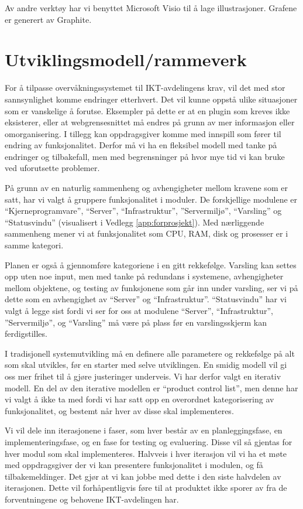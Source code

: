 Av andre verktøy har vi benyttet Microsoft Visio til å lage illustrasjoner. Grafene er generert av Graphite.

\section{Utviklingsmodell/rammeverk}
For å tilpasse overvåkningssystemet til IKT-avdelingens krav, vil det med stor sannsynlighet komme endringer etterhvert. Det vil kunne oppstå ulike situasjoner som er vanskelige å forutse. Eksempler på dette er at en plugin som kreves ikke eksisterer, eller at webgrensesnittet må endres på grunn av mer informasjon eller omorganisering. I tillegg kan oppdragsgiver komme med innspill som fører til endring av funksjonalitet. Derfor må vi ha en fleksibel modell med tanke på endringer og tilbakefall, men med begrensninger på hvor mye tid vi kan bruke ved uforutsette problemer.

På grunn av en naturlig sammenheng og avhengigheter mellom kravene som er satt, har vi valgt å gruppere funksjonalitet i moduler. De forskjellige modulene er ``Kjerneprogramvare'', ``Server'', ``Infrastruktur'', ''Servermiljø'', ``Varsling'' og ``Statusvindu'' (visualisert i Vedlegg \ref{app:forprosjekt}). Med nærliggende sammenheng mener vi at funksjonalitet som CPU, RAM, disk og prosesser er i samme kategori. 

Planen er også å gjennomføre kategoriene i en gitt rekkefølge. Varsling kan settes opp uten noe input, men med tanke på redundans i systemene, avhengigheter mellom objektene, og testing av funksjonene som går inn under varsling, ser vi på dette som en avhengighet av ``Server'' og ``Infrastruktur''. ``Statusvindu'' har vi valgt å legge sist fordi vi ser for oss at modulene ``Server'', ``Infrastruktur'', ''Servermiljø'', og ``Varsling'' må være på plass før en varslingsskjerm kan ferdigstilles.

I tradisjonell systemutvikling må en definere alle parametere og rekkefølge på alt som skal utvikles, før en starter med selve utviklingen. En smidig modell vil gi oss mer frihet til å gjøre justeringer underveis. Vi har derfor valgt en iterativ modell\cite{wiki:iterativ}. En del av den iterative modellen er ``product control list'', men denne har vi valgt å ikke ta med fordi vi har satt opp en overordnet kategorisering av funksjonalitet, og bestemt når hver av disse skal implementeres.

Vi vil dele inn iterasjonene i faser, som hver består av en planleggingsfase, en implementeringsfase, og en fase for testing og evaluering. Disse vil så gjentas for hver modul som skal implementeres. Halvveis i hver iterasjon vil vi ha et møte med oppdragsgiver der vi kan presentere funksjonalitet i modulen, og få tilbakemeldinger. Det gjør at vi kan jobbe med dette i den siste halvdelen av iterasjonen. Dette vil forhåpentligvis føre til at produktet ikke sporer av fra de forventningene og behovene IKT-avdelingen har.

